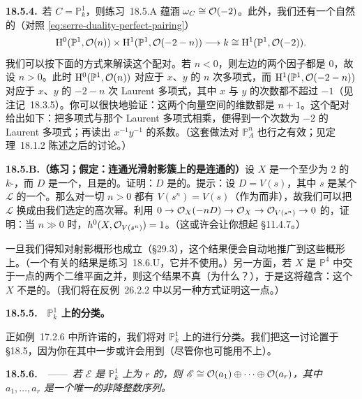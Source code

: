 \textbf{18.5.4.}\ \emph{}\quad 若 $C=\mathbb{P}^1_k$，则\mbox{练习~18.5.A} 蕴涵 $\omega_C\cong\mathcal{O}(-2)$。此外，我们还有一个自然的\trPerfectPairing{}（对照 \eqref{eq:serre-duality-perfect-pairing}）
\[
\mathrm{H}^0(\mathbb{P}^1,\mathcal{O}(n))\times\mathrm{H}^1(\mathbb{P}^1,\mathcal{O}(-2-n))\longrightarrow k\cong\mathrm{H}^1(\mathbb{P}^1,\mathcal{O}(-2)).
\]
我们可以按下面的方式来解读这个配对。若 $n<0$，则左边的两个因子都是 $0$，故设 $n>0$。此时 $\mathrm{H}^0(\mathbb{P}^1,\mathcal{O}(n))$ 对应于 $x$、$y$ 的 $n$ 次\trHomogeneous{}多项式，而 $\mathrm{H}^1(\mathbb{P}^1,\mathcal{O}(-2-n))$ 对应于 $x$、$y$ 的 $-2-n$ 次\trHomogeneous{} Laurent 多项式，其中 $x$ 与 $y$ 的次数都不超过 $-1$（见\mbox{注记~18.3.5}）。你可以很快地验证：这两个向量空间的维数都是 $n+1$。这个配对给出如下：把多项式与那个 Laurent 多项式相乘，便得到一个次数为 $-2$ 的 Laurent 多项式；再读出 $x^{-1}y^{-1}$ 的系数。（这套做法对 $\mathbb{P}^n_A$ 也行之有效；见\mbox{定理~18.1.2} 陈述之后的讨论。）

\textbf{18.5.B.（练习；假定\trSerreDuality：连通光滑射影簇上的\trAmple\trDivisor{}是连通的）}\quad 设 $X$ 是一个\trDimension{}至少为 $2$ 的\trConnected\trSmooth\trProjective{} $k$-\trVariety，而 $D$ 是一个\trEffectiveDivisor，且是\trAmple{}的。证明：$D$ 是\trConnected{}的。提示：设 $D=V(s)$，其中 $s$ 是某个\trAmple\trInvertibleSheaf{} $\mathscr{L}$ 的一个\trSection。那么对一切 $n>0$ 都有 $V(s^n)=V(s)$（作为\emph{\trVanishingSet}而非\emph{\trVanishingScheme}），故我们可以把 $\mathscr{L}$ 换成由我们选定的高次幂。利用 $0\to\mathcal{O}_X(-nD)\to\mathcal{O}_X\to\mathcal{O}_{V(s^n)}\to 0$ 的\trLongExactSequence，证明：当 $n\gg 0$ 时，$h^0(X,\mathcal{O}_{V(s^n)})=1$。（这或许会让你想起 \S11.4.7。）

一旦我们得知\trSerreDuality{}对\trCM{}射影概形也成立（\S29.3），这个结果便会自动地推广到这些概形上。（一个有关的结果是\mbox{练习~18.6.U}，它并不使用\trSerreDuality。）另一方面，若 $X$ 是 $\mathbb{P}^4$ 中交于一点的两个二维平面之并，则这个结果不真（为什么？），于是这将蕴含：这个 $X$ 不是\trCM{}的。（我们将在\mbox{反例~26.2.2} 中以另一种方式证明这一点。）

\textbf{18.5.5.}\ \hard\ \textbf{$\mathbb{P}^1_k$ 上\trVectorBundle{}的分类。}

正如\mbox{例~17.2.6} 中所许诺的，我们将对 $\mathbb{P}^1_k$ 上的\trVectorBundle{}进行分类。我们把这一讨论置于 \S18.5，因为你在其中一步或许会用到\trSerreDuality（尽管你也可能用不上）。

\textbf{18.5.6.\ }\ ——\ \emph{若 $\mathscr{E}$ 是 $\mathbb{P}^1_k$ 上\trRank{}为 $r$ 的\trVectorBundle，则 $\mathscr{E}\cong\mathcal{O}(a_1)\oplus\cdots\oplus\mathcal{O}(a_r)$，其中 $a_1,\dots,a_r$ 是一个唯一的非降整数序列。}

